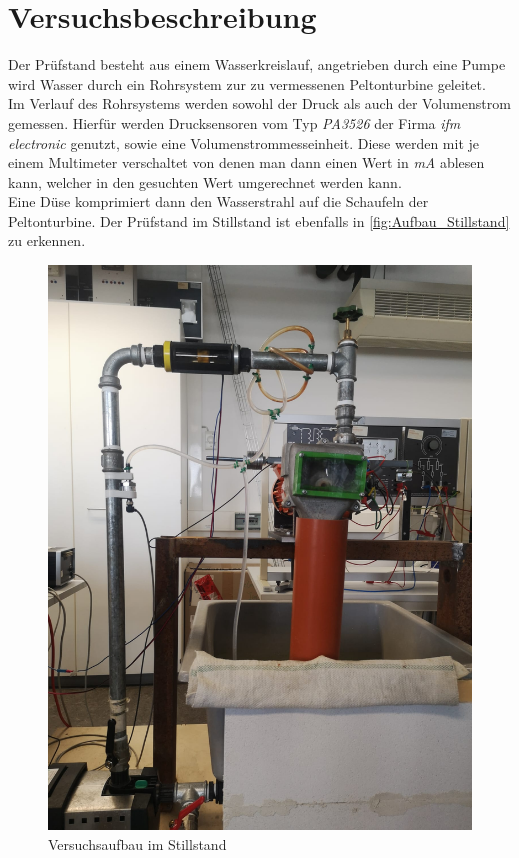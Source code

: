 \section{Versuchsbeschreibung}
\label{section:Versuchsbeschreibung}
%
Der Prüfstand besteht aus einem Wasserkreislauf, angetrieben durch eine Pumpe wird Wasser durch ein Rohrsystem zur zu vermessenen Peltonturbine geleitet.\\
Im Verlauf des Rohrsystems werden sowohl der Druck als auch der Volumenstrom gemessen.
Hierfür werden Drucksensoren vom Typ \textit{PA3526} der Firma \textit{ifm electronic} genutzt, sowie eine Volumenstrommesseinheit.
Diese werden mit je einem Multimeter verschaltet von denen man dann einen Wert in \textit{mA} ablesen kann, welcher in den gesuchten Wert umgerechnet werden kann.\\
Eine Düse komprimiert dann den Wasserstrahl auf die Schaufeln der Peltonturbine.
Der Prüfstand im Stillstand ist ebenfalls in \autoref{fig:Aufbau_Stillstand} zu erkennen.\\
%
\begin{figure}[!h]
    \centering
    \includegraphics[scale=0.15]{Abbildungen/Aufbau Pelton.jpeg}
    \caption{Versuchsaufbau im Stillstand}
    \label{fig:Aufbau_Stillstand}
\end{figure}

